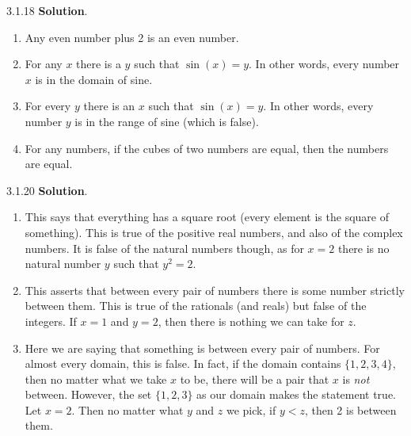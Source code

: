 \documentclass[11pt,]{book}
\theoremstyle{ptxplainnotitle}
\theoremstyle{ptxplaintitle}
\theoremstyle{ptxdefinitionnotitle}
\theoremstyle{ptxdefinitiontitle}
\theoremstyle{ptxdefinitionnotitle}
\theoremstyle{ptxdefinitiontitle}
\theoremstyle{ptxdefinitionnotitle}
\theoremstyle{ptxdefinitiontitle}
\theoremstyle{ptxdefinitiontitlenonumber}
\theoremstyle{ptxdefinitiontitlenonumber}
\numberwithin{equation}{chapter}
\newcommand{\lt}{<}
\begin{document}
\begin{divisionexercise}{3.1.18}
\textbf{Solution}.\quad%
\hypertarget{p-2213}{}%
\leavevmode%
\begin{enumerate}[label=(\alph*)]
\item\hypertarget{li-1160}{}\hypertarget{p-2214}{}%
Any even number plus 2 is an even number.%
\item\hypertarget{li-1161}{}\hypertarget{p-2215}{}%
For any \(x\) there is a \(y\) such that \(\sin(x) = y\). In other words, every number \(x\) is in the domain of sine.%
\item\hypertarget{li-1162}{}\hypertarget{p-2216}{}%
For every \(y\) there is an \(x\) such that \(\sin(x) = y\). In other words, every number \(y\) is in the range of sine (which is false).%
\item\hypertarget{li-1163}{}\hypertarget{p-2217}{}%
For any numbers, if the cubes of two numbers are equal, then the numbers are equal.%
\end{enumerate}
%
\end{divisionexercise}%
\begin{divisionexercise}{3.1.20}
\textbf{Solution}.\quad%
\hypertarget{p-2220}{}%
\leavevmode%
\begin{enumerate}[label=(\alph*)]
\item\hypertarget{li-1167}{}\hypertarget{p-2221}{}%
This says that everything has a square root (every element is the square of something). This is true of the positive real numbers, and also of the complex numbers. It is false of the natural numbers though, as for \(x = 2\) there is no natural number \(y\) such that \(y^2 = 2\).%
\item\hypertarget{li-1168}{}\hypertarget{p-2222}{}%
This asserts that between every pair of numbers there is some number strictly between them. This is true of the rationals (and reals) but false of the integers. If \(x = 1\) and \(y = 2\), then there is nothing we can take for \(z\).%
\item\hypertarget{li-1169}{}\hypertarget{p-2223}{}%
Here we are saying that something is between every pair of numbers. For almost every domain, this is false. In fact, if the domain contains \(\{1,2,3, 4\}\), then no matter what we take \(x\) to be, there will be a pair that \(x\) is \emph{not} between. However, the set \(\{1,2,3\}\) as our domain makes the statement true. Let \(x = 2\). Then no matter what \(y\) and \(z\) we pick, if \(y \lt  z\), then 2 is between them.%
\end{enumerate}
%
\end{divisionexercise}%
\end{document}
